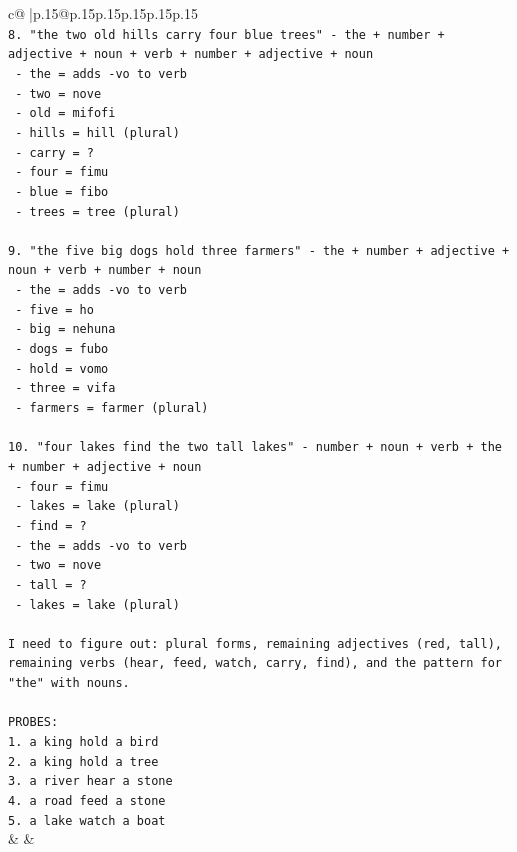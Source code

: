 \documentclass{article}
\begin{document}
{\begin{supertabular}{c@{$\;$}|p{.15\linewidth}@{}p{.15\linewidth}p{.15\linewidth}p{.15\linewidth}p{.15\linewidth}p{.15\linewidth}}
{{{\\ 
\texttt{8. "the two old hills carry four blue trees" {-} the + number + adjective + noun + verb + number + adjective + noun} \\
\texttt{   {-} the = adds {-}vo to verb} \\
\texttt{   {-} two = nove} \\
\texttt{   {-} old = mifofi} \\
\texttt{   {-} hills = hill (plural)} \\
\texttt{   {-} carry = ?} \\
\texttt{   {-} four = fimu} \\
\texttt{   {-} blue = fibo} \\
\texttt{   {-} trees = tree (plural)} \\
\\ 
\texttt{9. "the five big dogs hold three farmers" {-} the + number + adjective + noun + verb + number + noun} \\
\texttt{   {-} the = adds {-}vo to verb} \\
\texttt{   {-} five = ho} \\
\texttt{   {-} big = nehuna} \\
\texttt{   {-} dogs = fubo} \\
\texttt{   {-} hold = vomo} \\
\texttt{   {-} three = vifa} \\
\texttt{   {-} farmers = farmer (plural)} \\
\\ 
\texttt{10. "four lakes find the two tall lakes" {-} number + noun + verb + the + number + adjective + noun} \\
\texttt{    {-} four = fimu} \\
\texttt{    {-} lakes = lake (plural)} \\
\texttt{    {-} find = ?} \\
\texttt{    {-} the = adds {-}vo to verb} \\
\texttt{    {-} two = nove} \\
\texttt{    {-} tall = ?} \\
\texttt{    {-} lakes = lake (plural)} \\
\\ 
\texttt{I need to figure out: plural forms, remaining adjectives (red, tall), remaining verbs (hear, feed, watch, carry, find), and the pattern for "the" with nouns.} \\
\\ 
\texttt{PROBES:} \\
\texttt{1. a king hold a bird} \\
\texttt{2. a king hold a tree} \\
\texttt{3. a river hear a stone} \\
\texttt{4. a road feed a stone} \\
\texttt{5. a lake watch a boat} \\
            }
        }
    }
    & & \\ \\


\end{supertabular}}
\end{document}
